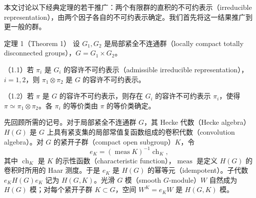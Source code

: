 本文讨论以下经典定理的若干推广：两个有限群的直积的不可约表示（irreducible representation），由两个因子各自的不可约表示确定。我们首先将这一结果推广到更一般的群。
\begin{originaltheorem}{定理 1（Theorem 1）}
设 $G_1,G_2$ 是局部紧全不连通群（locally compact totally disconnected groups），$G=G_1\times G_2$。

（1.1）若 $\pi_i$ 是 $G_i$ 的容许不可约表示（admissible irreducible representation），$i=1,2$，则 $\pi_1\otimes\pi_2$ 是 $G$ 的容许不可约表示。

（1.2）若 $\pi$ 是 $G$ 的容许不可约表示，则存在 $G_i$ 的容许不可约表示 $\pi_i$，使得 $\pi\simeq\pi_1\otimes\pi_2$。各 $\pi_i$ 的等价类由 $\pi$ 的等价类确定。
\end{originaltheorem}
先回顾所需的记号。对于局部紧全不连通群 $G$，其 Hecke 代数（Hecke algebra）$H(G)$ 是 $G$ 上具有紧支集的局部常值复函数组成的卷积代数（convolution algebra）。对 $G$ 的紧开子群（compact open subgroup）$K$，令
\[
e_K=(\operatorname{meas}K)^{-1}\operatorname{ch}_K,
\]
其中 $\operatorname{ch}_K$ 是 $K$ 的示性函数（characteristic function），$\operatorname{meas}$ 是定义 $H(G)$ 的卷积时所用的 Haar 测度。于是 $e_K$ 是 $H(G)$ 的幂等元（idempotent）。子代数 $e_KH(G)e_K$ 记为 $H(G,K)$。光滑 $G$ 模（smooth $G$-module）$W$ 自然成为 $H(G)$ 模；对每个紧开子群 $K\subset G$，空间 $W^K=e_KW$ 是 $H(G,K)$ 模。

